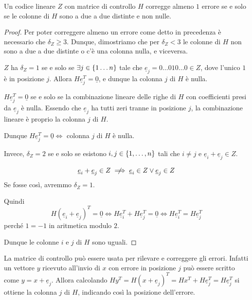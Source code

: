 \begin{theorem}{}
  Un codice lineare \(Z\) con matrice di controllo \(H\) corregge almeno \(1\) errore se e solo se le colonne di \(H\) sono a due a due distinte e non nulle.
\end{theorem}

\begin{proof}{}
  Per poter correggere almeno un errore come detto in precedenza è necessario che \(\delta_Z \geq 3\).
  Dunque, dimostriamo che per \(\delta_Z < 3\) le colonne di \(H\) non sono a due a due distinte o c'è una colonna nulla, e viceversa.

  \(Z\) ha \(\delta_Z = 1\) se e solo se \(\exists j \in \set{1\ldots n}\) tale che \(\underline{e}_j = 0\ldots 0 1 0 \ldots 0 \in Z\), dove l'unico \(1\) è in posizione \(j\).
  Allora \(H \underline{e}_j^T = \underline{0}\), e dunque la colonna \(j\) di \(H\) è nulla.

  \begin{note}{}
    \(H \underline{e}_j^T = \underline{0}\) se e solo se la combinazione lineare delle righe di \(H\) con coefficienti presi da \(\underline{e}_j\) è nulla.
    Essendo che \(\underline{e}_j\) ha tutti zeri tranne in posizione \(j\), la combinazione lineare è proprio la colonna \(j\) di \(H\).

    Dunque \(H \underline{e}_j^T = \underline{0} \iff\) colonna \(j\) di \(H\) è nulla.
  \end{note}

  Invece, \(\delta_Z = 2\) se e solo se esistono \(i,j \in \set{1, \ldots, n}\) tali che \(i\neq j\) e \(\underline{e}_i + \underline{e}_j \in Z\).

  \begin{note}{}
    \[\underline{e}_i + \underline{e}_j \in Z \centernot\implies \underline{e}_i \in Z \lor \underline{e}_j \in Z\]
    Se fosse così, avremmo \(\delta_Z = 1\).
  \end{note}

  Quindi 
  \[H{(\underline{e}_i + \underline{e}_j)}^T = \underline{0} \iff H\underline{e}_i^T + H\underline{e}_j^T = \underline{0} \iff H\underline{e}_i^T = H\underline{e}_j^T\]
  perché \(1 = -1\) in aritmetica modulo \(2\).

  Dunque le colonne \(i\) e \(j\) di \(H\) sono uguali.
\end{proof}

La matrice di controllo può essere usata per rilevare e correggere gli errori.
Infatti un vettore \(y\) ricevuto all'invio di \(x\) con errore in posizione \(j\) può essere scritto come \(y = x + \underline{e}_j\).
Allora calcolando \(H y^T = H {(x + \underline{e}_j)}^T = H x^T + H \underline{e}_j^T = H \underline{e}_j^T\) si ottiene la colonna \(j\) di \(H\), indicando così la posizione dell'errore.

